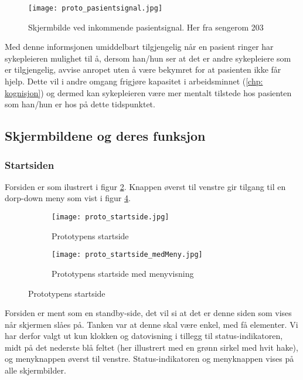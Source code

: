 \begin{figure}[H]
\centering
\texttt{[image: proto\_pasientsignal.jpg]}
\caption{Skjermbilde ved inkommende pasientsignal. Her fra sengerom 203}
\label{protoPasientsignal}
\end{figure}

Med denne informsjonen umiddelbart tilgjengelig når en pasient ringer har sykepleieren mulighet til å, dersom han/hun ser at det er andre sykepleiere som er tilgjengelig, avvise anropet uten å være bekymret for at pasienten ikke får hjelp. Dette vil i andre omgang frigjøre kapasitet i arbeidsminnet (\ref{chp: kognisjon}) og dermed kan sykepleieren være mer mentalt tilstede hos pasienten som han/hun er hos på dette tidspunktet.

\subsection{Skjermbildene og deres funksjon}

\subsubsection{Startsiden}
Forsiden er som ilustrert i figur \ref{proto_startside}. Knappen øverst til venstre gir tilgang til en dorp-down meny som vist i figur \ref{proto_startside_medMeny}. 

\begin{figure}[H]
	\centering
	\begin{subfigure}[b]{0.48\textwidth}
		\texttt{[image: proto\_startside.jpg]}
		\caption{Prototypens startside}
		\label{proto_startside}
	\end{subfigure}
	\begin{subfigure}[b]{0.48\textwidth}
		\texttt{[image: proto\_startside\_medMeny.jpg]}
		\caption{Prototypens startside med menyvisning}
		\label{proto_startside_medMeny}
	\end{subfigure}
	\caption{Prototypens startside}
\end{figure}

\noindent
Forsiden er ment som en standby-side, det vil si at det er denne siden som vises når skjermen slåes på. Tanken var at denne skal være enkel, med få elementer. Vi har derfor valgt ut kun klokken og datovisning i tillegg til status-indikatoren, midt på det nederste blå feltet (her illustrert med en grønn sirkel med hvit hake), og menyknappen øverst til venstre. Status-indikatoren og menyknappen vises på alle skjermbilder. 

